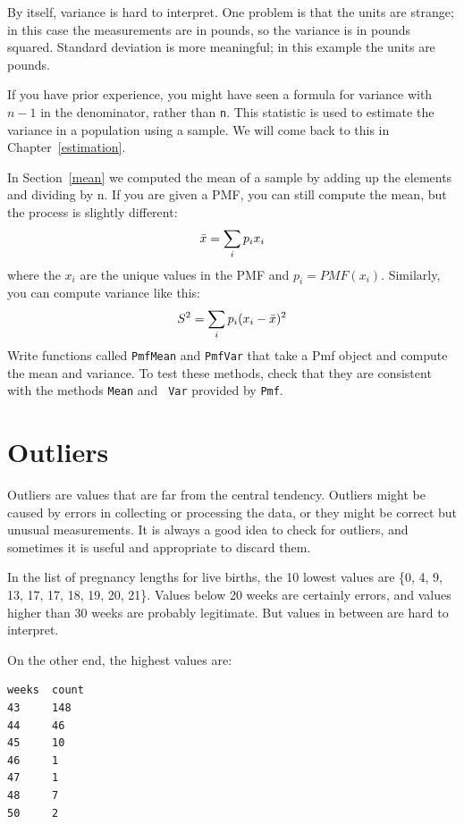 \documentclass[12pt]{book}
\begin{document}
By itself, variance is hard to interpret.  One problem is that the
units are strange; in this case the measurements are in pounds, so the
variance is in pounds squared.  Standard deviation is more meaningful;
in this example the units are pounds.

If you have prior experience, you might have seen a formula for
variance with $n-1$ in the denominator, rather than {\tt n}.  This
statistic is used to
estimate the variance in a population using a sample.  We will come
back to this in Chapter~\ref{estimation}.  


\begin{exercise}
%
%
In Section~\ref{mean} we computed the mean of a sample by adding up
the elements and dividing by n.  If you are given a PMF, you can
still compute the mean, but the process is slightly different:
%
\[ \bar{x} = \sum_i p_i x_i \]
%
where the $x_i$ are the unique values in the PMF and $p_i=PMF(x_i)$.
Similarly, you can compute variance like this:
%
\[ S^2 = \sum_i p_i (x_i - \bar{x})^2\]
% 
Write functions called {\tt PmfMean} and {\tt PmfVar} that take a
Pmf object and compute the mean and variance.  To test these methods,
check that they are consistent with the methods {\tt Mean} and {\tt
  Var} provided by {\tt Pmf}.

\end{exercise}


\section{Outliers}

Outliers are values that are far from the central tendency.  Outliers
might be caused by errors in collecting or processing the data, or
they might be correct but unusual measurements.  It is always a good
idea to check for outliers, and sometimes it is useful and appropriate
to discard them.


In the list of pregnancy lengths for live births, the 10 lowest values
are \{0, 4, 9, 13, 17, 17, 18, 19, 20, 21\}.  Values below 20
weeks are certainly errors, and values higher than 30 weeks are
probably legitimate.  But values in between are
hard to interpret.

On the other end, the highest values are:
%
\begin{verbatim}
weeks  count
43     148
44     46
45     10
46     1
47     1
48     7
50     2
\end{verbatim}
\end{document}
